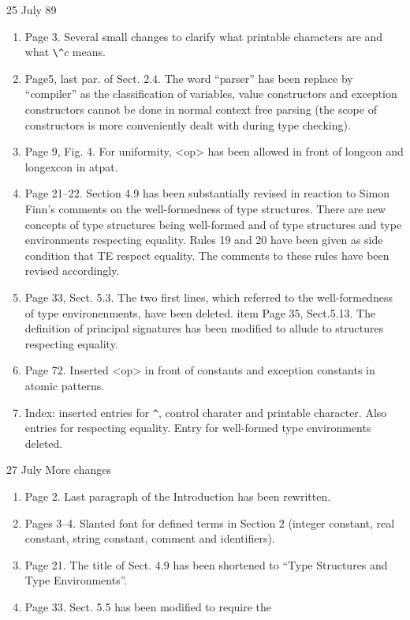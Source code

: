 \begin{description}
\item{25 July 89} 
\begin{enumerate}
\item Page 3. Several small changes to clarify what printable characters
are and what \verb+\^+$c$ means.
\item Page5, last par. of  Sect. 2.4. The word ``parser'' has been
replace by ``compiler'' as the classification of variables,
value constructors and exception constructors cannot be done
in normal context free parsing (the scope of constructors is more 
conveniently dealt with during type checking).
\item Page 9, Fig. 4.  For uniformity, <op> has been allowed in front
of longcon and longexcon in atpat.
\item Page 21--22. Section 4.9 has been substantially revised
in reaction to Simon Finn's comments on the well-formedness
of type structures.  There are new concepts of type structures
being well-formed and of type structures and type environments
respecting equality.  Rules 19 and 20 have been given as side
condition that TE respect equality. The comments to these
rules have been revised accordingly.
\item Page 33, Sect. 5.3. The two first lines, which referred to
the well-formedness of type environenments, have been deleted.
item Page 35, Sect.5.13.  The definition of principal signatures
has been modified to allude to structures respecting equality.
\item Page 72. Inserted <op> in front of constants and exception 
constants in atomic patterns.
\item Index: inserted entries for \verb;^;, control charater and printable
character. Also entries for respecting equality. Entry for well-formed
type environments deleted.
\end{enumerate}
\item{27 July} More changes
\begin{enumerate}
\item Page 2. Last paragraph of the Introduction has been rewritten.
\item Pages 3--4. Slanted font for defined terms in Section 2 (integer 
constant, real constant,  string constant, comment and identifiers).
\item Page 21. The title of Sect. 4.9 has been shortened to
``Type Structures and Type Environments''.
\item Page 33. Sect. 5.5 has been modified to require the {\sl
}
\end{enumerate}
\end{description}

